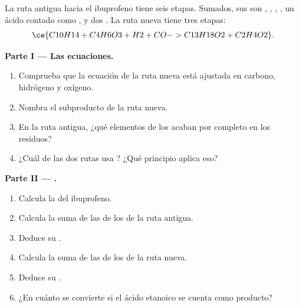 \begin{problem}
\label{pb:g12:synthesis-strategy:1}
La ruta antigua hacia el ibuprofeno  tiene seis etapas.
Sumados, sus  son , ,
, , un ácido contado como ,
 y dos . La ruta nueva tiene tres etapas:
\[
  \ce{C10H14 + C4H6O3 + H2 + CO -> C13H18O2 + C2H4O2} .
\]

\medskip
\noindent\textbf{Parte I --- Las ecuaciones.}
\begin{enumerate}
  \item Comprueba que la ecuación de la ruta nueva está ajustada en
        carbono, hidrógeno y oxígeno.
  \item Nombra el subproducto de la ruta nueva.
  \item En la ruta antigua, ¿qué elementos de los  acaban por
        completo en los residuos?
  \item ¿Cuál de las dos rutas usa ? ¿Qué principio aplica
        eso?
\end{enumerate}

\medskip
\noindent\textbf{Parte II --- .}
\begin{enumerate}[resume]
  \item Calcula la  del ibuprofeno.
  \item Calcula la suma de las  de los  de la ruta
        antigua.
  \item Deduce su .
  \item Calcula la suma de las  de los  de la ruta
        nueva.
  \item Deduce su .
  \item ¿En cuánto se convierte si el ácido etanoico se cuenta como
        producto?
\end{enumerate}


\end{problem}
